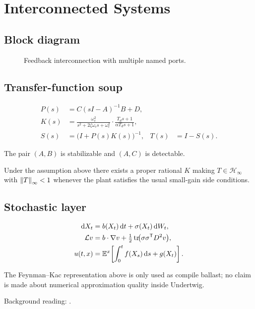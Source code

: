 \chapter{Interconnected Systems}
\label{ch:systems}

\section{Block diagram}
\begin{figure}[ht]
\centering

\caption{Feedback interconnection with multiple named ports.}
\label{fig:control}
\end{figure}

\section{Transfer-function soup}
\begin{align}
P(s)
&=
C(sI-A)^{-1}B+D,
\\
K(s)
&=
\frac{\omega_{c}^{2}}{s^{2}+2\zeta\omega_{c}s+\omega_{c}^{2}}
\cdot
\frac{T_{d}s+1}{\alpha T_{d}s+1},
\\
S(s)
&=
\bigl(I+P(s)K(s)\bigr)^{-1},
&
T(s)
&=
I-S(s).
\end{align}

\begin{assumption}
The pair $(A,B)$ is stabilizable and $(A,C)$ is detectable.
\end{assumption}

\begin{corollary}
Under the assumption above there exists a proper rational $K$ making
$T\in\mathcal{H}_{\infty}$ with $\left\lVert T\right\rVert_{\infty}<1$ whenever the plant
satisfies the usual small-gain side conditions.
\end{corollary}

\section{Stochastic layer}
\begin{align}
\mathrm{d}X_{t}
&=
b(X_{t})\,\mathrm{d}t
+
\sigma(X_{t})\,\mathrm{d}W_{t},
\\
\mathcal{L}v
&=
b\cdot\nabla v
+
\tfrac12\operatorname{tr}\!\bigl(\sigma\sigma^{\mathsf T}D^{2}v\bigr),
\\
u(t,x)
&=
\mathbb{E}^{x}\!\left[
\int_{0}^{t}
f(X_{s})\,\mathrm{d}s
+
g(X_{t})
\right].
\end{align}

\begin{remark}
The Feynman--Kac representation above is only used as compile ballast; no
claim is made about numerical approximation quality inside Undertwig.
\end{remark}

Background reading: \cite{ZhouDoyleGlover1996,Oksendal2003,Khalil2002}.
